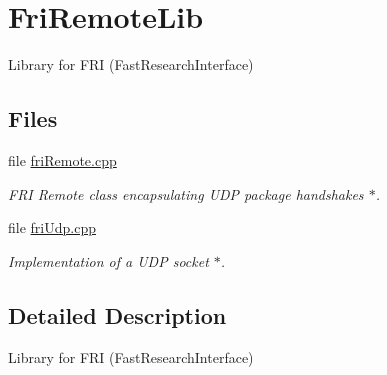 \hypertarget{group__friRemoteLib}{\section{Fri\-Remote\-Lib}
\label{group__friRemoteLib}
}


Library for F\-R\-I (Fast\-Research\-Interface)  


\subsection*{Files}
\begin{DoxyCompactItemize}
\item 
file \hyperlink{friRemote_8cpp}{fri\-Remote.\-cpp}
\begin{DoxyCompactList}\small\item\em F\-R\-I Remote class encapsulating U\-D\-P package handshakes $\ast$. \end{DoxyCompactList}\item 
file \hyperlink{friUdp_8cpp}{fri\-Udp.\-cpp}
\begin{DoxyCompactList}\small\item\em Implementation of a U\-D\-P socket $\ast$. \end{DoxyCompactList}\end{DoxyCompactItemize}


\subsection{Detailed Description}
Library for F\-R\-I (Fast\-Research\-Interface) 